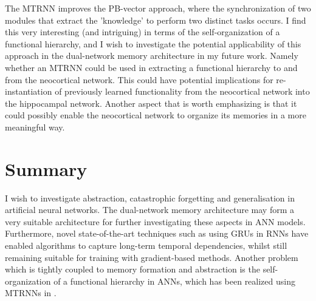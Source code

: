The MTRNN improves the PB-vector approach, where the synchronization of two modules that extract the 'knowledge' to perform two distinct tasks occurs. I find this very interesting (and intriguing) in terms of the self-organization of a functional hierarchy, and I wish to investigate the potential applicability of this approach in the dual-network memory architecture in my future work. Namely whether an MTRNN could be used in extracting a functional hierarchy to and from the neocortical network. This could have potential implications for re-instantiation of previously learned functionality from the neocortical network into the hippocampal network. Another aspect that is worth emphasizing is that it could possibly enable the neocortical network to organize its memories in a more meaningful way.

\section{Summary}

I wish to investigate abstraction, catastrophic forgetting and generalisation in artificial neural networks. The dual-network memory architecture \citep{McClelland1995, French1997, Ans1997, Hattori2014} may form a very suitable architecture for further investigating these aspects in ANN models. Furthermore, novel state-of-the-art techniques such as using GRUs in RNNs have enabled algorithms to capture long-term temporal dependencies, whilst still remaining suitable for training with gradient-based methods. Another problem which is tightly coupled to memory formation and abstraction is the self-organization of a functional hierarchy in ANNs, which has been realized using MTRNNs in \citep{Yamashita2008, Tani2014}.


\cleardoublepage